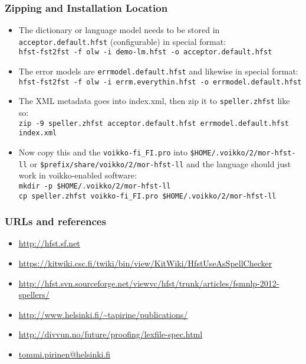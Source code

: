 \documentclass[t,12pt]{beamer}
\begin{document}
\begin{frame}
    \frametitle{Zipping and Installation Location}
    \begin{itemize}
        \item The dictionary or language model needs to be stored in
            \texttt{acceptor.default.hfst} (configurable) in special format:\\
            \texttt{hfst-fst2fst -f olw -i demo-lm.hfst -o acceptor.default.hfst}
        \item The error models are \texttt{errmodel.default.hfst} and likewise
            in special format:
            \texttt{hfst-fst2fst -f olw -i errm.everythin.hfst -o errmodel.default.hfst}
        \item The XML metadata goes into index.xml, then zip it to 
            \texttt{speller.zhfst} like so: \\
            \texttt{zip -9 speller.zhfst acceptor.default.hfst errmodel.default.hfst index.xml}
        \item Now copy this and the \texttt{voikko-fi\_FI.pro} into 
            \texttt{\$HOME/.voikko/2/mor-hfst-ll} or 
            \texttt{\$prefix/share/voikko/2/mor-hfst-ll} and the language should just
            work in voikko-enabled software:\\
            \texttt{mkdir -p \$HOME/.voikko/2/mor-hfst-ll\\
            cp speller.zhfst voikko-fi\_FI.pro \$HOME/.voikko/2/mor-hfst-ll}
    \end{itemize}
\end{frame}

\begin{frame}
    \frametitle{URLs and references}
    \begin{itemize}
        \item \url{http://hfst.sf.net}
        \item \url{https://kitwiki.csc.fi/twiki/bin/view/KitWiki/HfstUseAsSpellChecker}
        \item \url{http://hfst.svn.sourceforge.net/viewvc/hfst/trunk/articles/fsmnlp-2012-spellers/}
        \item \url{http://www.helsinki.fi/~tapirine/publications/}
        \item \url{http://divvun.no/future/proofing/lexfile-spec.html}
        \item \url{tommi.pirinen@helsinki.fi}
    \end{itemize}
\end{frame}
\end{document}
